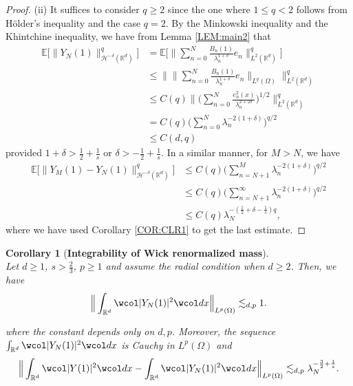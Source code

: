 \documentclass[%
11pt,  reqno]{amsart}
\newtheorem{corollary}[theorem]{Corollary}
\theoremstyle{remarkstyle}
\newcommand{\1}{\hspace{0.2mm}\text{I}\hspace{0.2mm}}
\newcommand{\noi}{\noindent}
\newcommand{\R}{\mathbb{R}}
\newcommand{\E}{\mathbb{E}}
\newcommand{\dl}{\delta}
\newcommand{\ld}{\lambda}
\newcommand{\wick}[1]{\wcol#1\wcol}
\renewcommand{\O}{\Omega}
\newcommand{\les}{\lesssim}
\numberwithin{equation}{section}
\numberwithin{theorem}{section}
\begin{document}
\begin{proof}
		(ii) It suffices to consider $q\ge 2$ since the one where $1\le q <2$ follows from H\"older's inequality and the case $q=2$. By the Minkowski inequality and the Khintchine inequality, we have from Lemma \ref{LEM:main2} that
		\begin{align*}
			\E \big[\|Y_N(1)\|^q_{\mathcal H^{-\dl}(\R^d)} \big] &= \E\Big[\Big\|\sum_{n=0}^N \frac{B_n(1)}{\ld_n^{1+\dl}} e_n \Big\|^q_{L^2(\R^d)}\Big] \\
			&\le \Big\| \Big\| \sum_{n=0}^N \frac{B_n(1)}{\ld_n^{1+\dl}} e_n \Big\|_{L^q(\Omega)}\Big\|_{L^2(\R^d)}^q \\
			&\le C(q) \Big\| \Big( \sum_{n=0}^N \frac{e^2_n(x)}{\ld_n^{2+2\dl}}\Big)^{1/2} \Big\|_{L^2(\R^d)}^q \\
			&= C(q) \Big( \sum_{n=0}^N \ld_n^{-2(1+\dl)} \Big)^{q/2}\\
			&\le C(d,q)
		\end{align*}
		provided $1+\dl > \frac12 + \frac1s$ or $\dl > -\frac12 + \frac1s$. In a similar manner, for $M>N$, we have 
		\begin{align*}
			\E \big[\|Y_M(1)-Y_N(1)\|^q_{\mathcal H^{-\dl}(\R^d)} \big] &\leq C(q) \Big( \sum_{n=N+1}^M \ld_n^{-2(1+\dl)} \Big)^{q/2} \\
			&\leq C(q) \Big( \sum_{n=N+1}^\infty \ld_n^{-2(1+\dl)} \Big)^{q/2} \\
			&\leq C(q) \ld_N^{-\left(\frac12 +\dl -\frac1s \right) q},
		\end{align*}
		where we have used Corollary \ref{COR:CLR1} to get the last estimate. 
	\end{proof}
	
	
	\begin{corollary}[\bf Integrability of Wick renormalized mass]
		\label{COR:WCE} \mbox{} \\
		Let $d\geq 1$, $s>\frac23$, $p\ge 1$ and assume the radial condition when $d\ge 2$. 
		Then, we have
		\[
		\Big\|\int_{\R^d} \wick{|Y_N (1)|^2} dx \Big\|_{L^p(\O)} \les_{d,p} 1.
		\]
		
		\noi
		where the constant depends only on $d, p$. Moreover, the sequence $\int_{\R^d} \wick{|Y_N (1)|^2}dx$ is Cauchy in $L^p(\O)$ and  
		$$ 
		\Big\|\int_{\R^d} \wick{|Y (1)|^2} dx - \int_{\R^d} \wick{|Y_N (1)|^2} dx \Big\|_{L^p(\O)} \les_{d,p} \ld_N^{- \frac32 + \frac1s}.
		$$
	\end{corollary}
	
\end{document}

